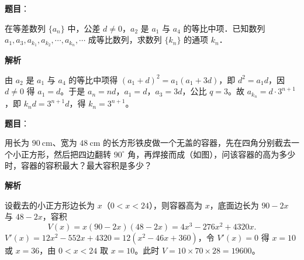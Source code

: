 \begin{answer}

\textbf{题目}：

在等差数列 $\{a_n\}$ 中，公差 $d \neq 0$，$a_2$ 是 $a_1$ 与 $a_4$ 的等比中项．已知数列 $a_1, a_3, a_{k_1}, a_{k_2}, \cdots, a_{k_n}, \cdots$ 成等比数列，求数列 $\{k_n\}$ 的通项 $k_n$．

\textbf{解析}

由 $a_2$ 是 $a_1$ 与 $a_4$ 的等比中项得 $(a_1 + d)^2 = a_1(a_1 + 3d)$，即 $d^2 = a_1 d$，因 $d \neq 0$ 得 $a_1 = d$。于是 $a_n = nd$，$a_1 = d$，$a_3 = 3d$，公比 $q = 3$。故 $a_{k_n} = d\cdot 3^{n+1}$，即 $k_n d = 3^{n+1} d$，得 $k_n = 3^{n+1}$。


\end{answer}
\begin{answer}

\textbf{题目}：

用长为 $90\ \mathrm{cm}$、宽为 $48\ \mathrm{cm}$ 的长方形铁皮做一个无盖的容器，先在四角分别截去一个小正方形，然后把四边翻转 $90^\circ$ 角，再焊接而成（如图），问该容器的高为多少时，容器的容积最大？最大容积是多少？
\nopagebreak[4]
\begin{center}\end{center}
\nopagebreak[4]
\textbf{解析}

设截去的小正方形边长为 $x$（$0 < x < 24$），则容器高为 $x$，底面边长为 $90 - 2x$ 与 $48 - 2x$，容积
\nopagebreak[4]
\[
V(x) = x(90-2x)(48-2x) = 4x^3 - 276x^2 + 4320x.
\]
$V'(x) = 12x^2 - 552x + 4320 = 12\left(x^2 - 46x + 360\right)$，令 $V'(x) = 0$ 得 $x = 10$ 或 $x = 36$，由 $0 < x < 24$ 取 $x = 10$。此时 $V = 10\times 70\times 28 = 19600$。


\end{answer}
